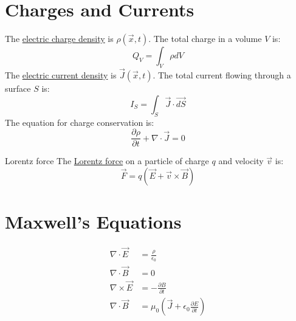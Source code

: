 \documentclass[../Main.tex]{subfiles}
\begin{document}
\section{Charges and Currents}
The \underline{electric charge density} is $\rho(\vec{x}, t)$. The total charge in a volume $V$ is:
\begin{equation*}
    Q_V = \int_V \rho dV
\end{equation*}
The \underline{electric current density} is $\vec{J}(\vec{x}, t)$. The total current flowing through a surface $S$ is:
\begin{equation*}
    I_S = \int_S \vec{J} \cdot \vec{dS}
\end{equation*}
The equation for charge conservation is:
\begin{equation}
    \frac{\partial \rho}{\partial t} + \nabla \cdot \vec{J} = 0
    \label{eqnChargeConserve}
\end{equation}
\begin{definition}{Lorentz force}
    The \underline{Lorentz force} on a particle of charge $q$ and velocity $\vec{v}$ is:
    \begin{equation*}
        \vec{F} = q(\vec{E} + \vec{v} \times \vec{B})
    \end{equation*}
\end{definition}
\section{Maxwell's Equations}
\begin{align}
    \nabla \cdot \vec{E} &= \frac{\rho}{\epsilon_0} \label{eqnMED} \\
    \nabla \cdot \vec{B} &= 0 \label{eqnMBD} \\
    \nabla \times \vec{E} &= - \frac{\partial B}{\partial t} \label{eqnMEC} \\
    \nabla \cdot \vec{B} &= \mu_0 \left(\vec{J} + \epsilon_0 \frac{\partial E}{\partial t}\right) \label{eqnMBC}
\end{align}
\end{document}
